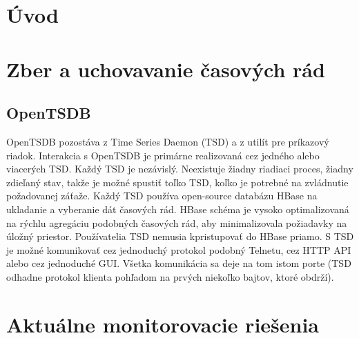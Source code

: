 \documentclass[11pt,final,oneside]{fithesis}
\begin{document}
\FrontMatter
\ThesisTitlePage

\begin{ThesisDeclaration}
\DeclarationText
\AdvisorName
\end{ThesisDeclaration}


\begin{ThesisThanks}
\end{ThesisThanks}

\begin{ThesisAbstract}
\end{ThesisAbstract}

\begin{ThesisKeyWords}
\end{ThesisKeyWords}

\tableofcontents
{}

\MainMatter
\chapter{Úvod}

\chapter{Zber a uchovavanie časových rád}
\section{OpenTSDB}
OpenTSDB pozostáva z Time Series Daemon (TSD) a z utilít pre príkazový riadok. Interakcia s OpenTSDB je primárne realizovaná cez jedného alebo viacerých TSD. Každý TSD je nezávislý.
Neexistuje žiadny riadiaci proces, žiadny zdieľaný stav, takže je možné spustiť toľko TSD, koľko je potrebné na zvládnutie požadovanej záťaže. Každý TSD používa open-source databázu HBase
na ukladanie a vyberanie dát časových rád. HBase schéma je vysoko optimalizovaná na rýchlu agregáciu podobných časových rád, aby minimalizovala požiadavky na úložný priestor. 
Používatelia TSD nemusia kpristupovať do HBase priamo. S TSD je možné komunikovať cez jednoduchý protokol podobný Telnetu, cez HTTP API alebo cez jednoduché GUI. Všetka komunikácia
sa deje na tom istom porte (TSD odhadne protokol klienta pohľadom na prvých niekoľko bajtov, ktoré obdrží).\cite{openTSDB}




\chapter{Aktuálne monitorovacie riešenia}
\end{document}
